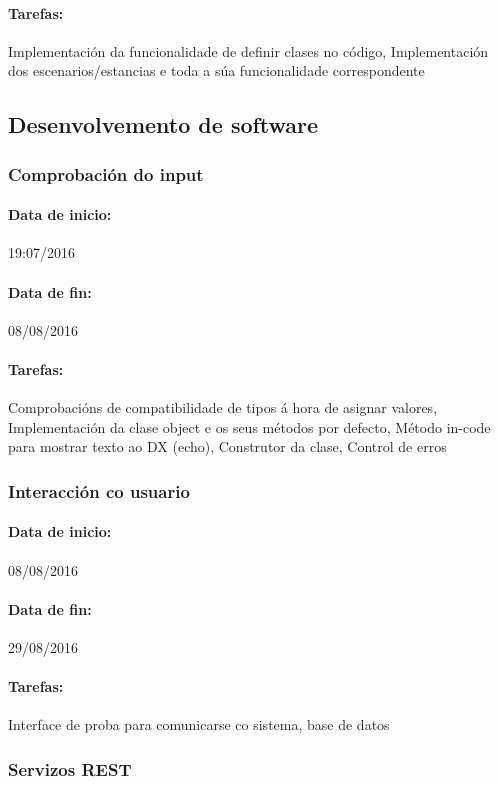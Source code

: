 \paragraph{Tarefas:} Implementación da funcionalidade de definir clases no
código, Implementación dos escenarios/estancias e toda a súa funcionalidade
correspondente


\subsection{Desenvolvemento de software}
\subsubsection{Comprobación do input}
\paragraph{Data de inicio:} 19:07/2016
\paragraph{Data de fin:} 08/08/2016
\paragraph{Tarefas:} Comprobacións de compatibilidade de tipos á hora de asignar
valores, Implementación da clase object e os seus métodos por defecto, Método
in-code para mostrar texto ao DX (echo), Construtor da clase, Control de erros

\subsubsection{Interacción co usuario}
\paragraph{Data de inicio:} 08/08/2016
\paragraph{Data de fin:} 29/08/2016
\paragraph{Tarefas:} Interface de proba para comunicarse co sistema, base de
datos

\subsubsection{Servizos REST}
